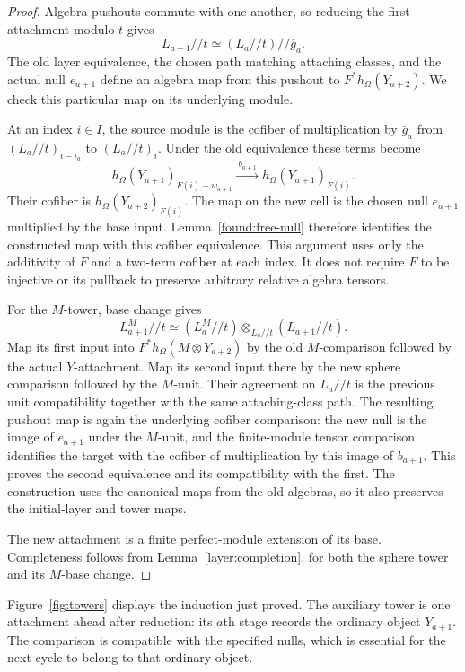 \begin{proof}
Algebra pushouts commute with one another, so reducing the first
attachment modulo $t$ gives
\[
 L_{a+1}//t\simeq (L_a//t)//\overline g_a.
\]
The old layer equivalence, the chosen path matching attaching
classes, and the actual null $e_{a+1}$ define an algebra map from
this pushout to $F^*h_\Omega(Y_{a+2})$.  We check this particular
map on its underlying module.

At an index $i\in I$, the source module is the cofiber of
multiplication by $\overline g_a$ from
$(L_a//t)_{i-i_a}$ to $(L_a//t)_i$.  Under the old equivalence these
terms become
\[
 h_\Omega(Y_{a+1})_{F(i)-w_{a+1}}
 \xrightarrow{\ b_{a+1}\ }
 h_\Omega(Y_{a+1})_{F(i)}.
\]
Their cofiber is $h_\Omega(Y_{a+2})_{F(i)}$.  The map on the new
cell is the chosen null $e_{a+1}$ multiplied by the base input.
Lemma~\ref{found:free-null} therefore identifies the constructed
map with this cofiber equivalence.  This argument uses only the
additivity of $F$ and a two-term cofiber at each index.  It does not
require $F$ to be injective or its pullback to preserve arbitrary
relative algebra tensors.

For the $M$-tower, base change gives
\[
 L_{a+1}^M//t\simeq
 (L_a^M//t)\otimes_{L_a//t}(L_{a+1}//t).
\]
Map its first input into $F^*h_\Omega(M\otimes Y_{a+2})$ by the
old $M$-comparison followed by the actual $Y$-attachment.  Map its
second input there by the new sphere comparison followed by the
$M$-unit.  Their agreement on $L_a//t$ is the previous unit
compatibility together with the same attaching-class path.
The resulting pushout map is again the underlying cofiber
comparison: the new null is the image of $e_{a+1}$ under the
$M$-unit, and the finite-module tensor comparison identifies the
target with the cofiber of multiplication by this image of
$b_{a+1}$.  This proves the second equivalence and its compatibility
with the first.  The construction uses the canonical maps from the
old algebras, so it also preserves the initial-layer and tower maps.

The new attachment is a finite perfect-module extension of its
base.  Completeness follows from Lemma~\ref{layer:completion}, for
both the sphere tower and its $M$-base change.
\end{proof}

Figure~\ref{fig:towers} displays the induction just proved. The
auxiliary tower is one attachment ahead after reduction: its $a$th
stage records the ordinary object $Y_{a+1}$. The comparison is
compatible with the specified nulls, which is essential for the
next cycle to belong to that ordinary object.


